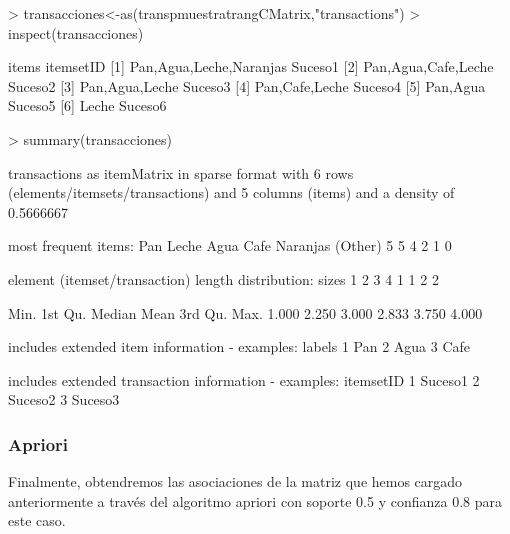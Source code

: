 \documentclass [a4paper] {article}
\begin{document}
\begin{Schunk}
\begin{Sinput}
> transacciones<-as(transpmuestratrangCMatrix,"transactions")
> inspect(transacciones)
\end{Sinput}
\begin{Soutput}
    items                     itemsetID
[1] {Pan,Agua,Leche,Naranjas} Suceso1  
[2] {Pan,Agua,Cafe,Leche}     Suceso2  
[3] {Pan,Agua,Leche}          Suceso3  
[4] {Pan,Cafe,Leche}          Suceso4  
[5] {Pan,Agua}                Suceso5  
[6] {Leche}                   Suceso6  
\end{Soutput}
\begin{Sinput}
> summary(transacciones)
\end{Sinput}
\begin{Soutput}
transactions as itemMatrix in sparse format with
 6 rows (elements/itemsets/transactions) and
 5 columns (items) and a density of 0.5666667 

most frequent items:
     Pan    Leche     Agua     Cafe Naranjas  (Other) 
       5        5        4        2        1        0 

element (itemset/transaction) length distribution:
sizes
1 2 3 4 
1 1 2 2 

   Min. 1st Qu.  Median    Mean 3rd Qu.    Max. 
  1.000   2.250   3.000   2.833   3.750   4.000 

includes extended item information - examples:
  labels
1    Pan
2   Agua
3   Cafe

includes extended transaction information - examples:
  itemsetID
1   Suceso1
2   Suceso2
3   Suceso3
\end{Soutput}
\end{Schunk}

\subsubsection{Apriori}
Finalmente, obtendremos las asociaciones de la matriz que hemos cargado anteriormente a través del algoritmo apriori
con soporte 0.5 y confianza 0.8 para este caso.
\end{document}
